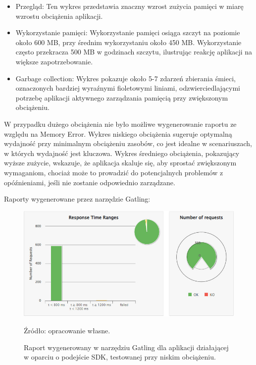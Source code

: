 \documentclass[runningheads,12pt]{llncs}
\begin{document}
\begin{itemize}
    \item Przegląd: Ten wykres przedstawia znaczny wzrost zużycia pamięci w miarę wzrostu obciążenia aplikacji.
    \item Wykorzystanie pamięci: Wykorzystanie pamięci osiąga szczyt na poziomie około 600 MB, przy średnim wykorzystaniu około 450 MB. Wykorzystanie często przekracza 500 MB w godzinach szczytu, ilustrując reakcję aplikacji na większe zapotrzebowanie.
    \item Garbage collection: Wykres pokazuje około 5-7 zdarzeń zbierania śmieci, oznaczonych bardziej wyraźnymi fioletowymi liniami, odzwierciedlającymi potrzebę aplikacji aktywnego zarządzania pamięcią przy zwiększonym obciążeniu.
\end{itemize}

W przypadku dużego obciążenia nie było możliwe wygenerowanie raportu ze względu na Memory Error.
Wykres niskiego obciążenia sugeruje optymalną wydajność przy minimalnym obciążeniu zasobów, co jest idealne w scenariuszach, w których wydajność jest kluczowa. Wykres średniego obciążenia, pokazujący wyższe zużycie, wskazuje, że aplikacja skaluje się, aby sprostać zwiększonym wymaganiom, chociaż może to prowadzić do potencjalnych problemów z opóźnieniami, jeśli nie zostanie odpowiednio zarządzane.

\newpage


Raporty wygenerowane przez narzędzie Gatling:

\begin{figure}
    \centering
    \includegraphics[width=0.8\linewidth]{images/sdk-gatling-low-graph.jpg}
    \caption{Raport wygenerowany w narzędziu Gatling dla aplikacji działającej w oparciu o podejście SDK, testowanej przy niskim obciążeniu.}
    \label{fig:low}
    \vspace{0.5em}
    {\small Źródło: opracowanie własne.}
\end{figure}
\end{document}
